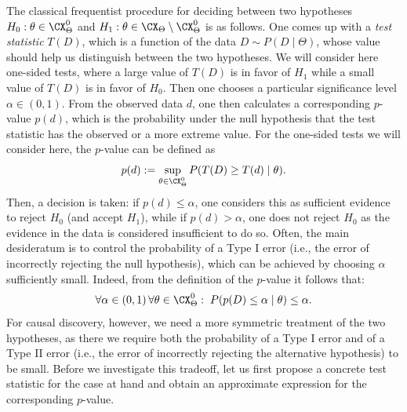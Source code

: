 The classical frequentist procedure for deciding between two hypotheses $H_0 : \theta \in \CX_\Theta^0$
and $H_1 : \theta \in \CX_\Theta\setminus\CX_\Theta^0$ is as follows.
One comes up with a \emph{test statistic} $T(D)$, which is a function of the data $D \sim P(D \mid \Theta)$, 
whose value should help us distinguish between the two hypotheses. 
We will consider here one-sided tests, where a large value of $T(D)$ is in favor of $H_1$ while a small value of $T(D)$ is in favor of $H_0$. 
Then one chooses a particular significance level $\alpha \in (0,1)$. From
the observed data $d$, one then calculates a corresponding $p$-value $p(d)$, which is the probability under 
the null hypothesis that the test statistic has the observed or a more extreme value. For the
one-sided tests we will consider here, the $p$-value can be defined as
$$p(d) := \sup_{\theta\in\CX_\Theta^0} P(T(D) \ge T(d) \mid \theta).$$
Then, a decision is taken: if $p(d) \le \alpha$, one considers this as sufficient evidence to reject $H_0$ 
(and accept $H_1$), while if $p(d) > \alpha$, one does not reject $H_0$ as the evidence in the data 
is considered insufficient to do so.
Often, the main desideratum is to control the probability of a Type I error (i.e., the error of incorrectly
rejecting the null hypothesis), which can be achieved by choosing $\alpha$ sufficiently small.
Indeed, from the definition of the $p$-value it follows that:
  \[ \forall \alpha \in (0,1)\, \forall \theta \in \CX_\Theta^0:\;  P( p(D) \le \alpha \mid \theta) \le \alpha.\]
For causal discovery, however, we need a more symmetric treatment of the two hypotheses, 
as there we require both the probability of a Type I error and of a Type II error (i.e., the error of incorrectly 
rejecting the alternative hypothesis) to be small. Before we investigate this
tradeoff, let us first propose a concrete test statistic for the case at hand and 
obtain an approximate expression for the corresponding $p$-value.

